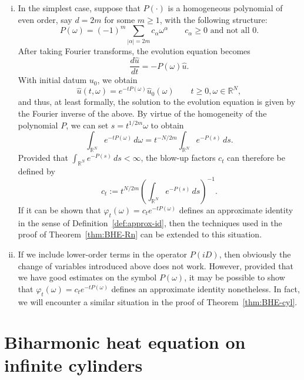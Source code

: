 \documentclass[a4paper, reqno,titlepage]{amsart}
\numberwithin{equation}{section}
\theoremstyle{plain}
\theoremstyle{definition}
\theoremstyle{remark}
\newcommand{\RR}{\mathbb{R}}
\begin{document}
\begin{enumerate}[(i)]
\item In the simplest case, suppose that $P(\cdot)$ is a homogeneous polynomial of even order, say $d = 2m$ for some $m \geq 1$, with the following structure:
  \begin{equation*}
    P(\omega) = (-1)^m \sum_{|\alpha| = 2m} c_\alpha \omega^\alpha \qquad c_\alpha \geq 0 \text{ and not all }0.
  \end{equation*}
  After taking Fourier transforms, the evolution equation becomes
  \begin{equation*}
    \frac{d \widehat{u}}{dt} = -P(\omega) \widehat{u}.
  \end{equation*}
  With initial datum $u_0$, we obtain
  \begin{equation*}
    \widehat{u}(t, \omega) = e^{-t P(\omega)} \widehat{u}_0(\omega) \qquad t \geq 0, \omega \in \RR^N,
  \end{equation*}
  and thus, at least formally, the solution to the evolution equation is given by the Fourier inverse of the above. By virtue of the homogeneity of the polynomial $P$, we can set $s = t^{1/2m} \omega$ to obtain
  \begin{equation*}
    \int_{\RR^N} e^{-tP(\omega)} \,d\omega = t^{-N/2m} \int_{\RR^N} e^{-P(s)} \,ds.
  \end{equation*}
  Provided that $\int_{\RR^N} e^{-P(s)} \,ds < \infty$, the blow-up factors $c_t$ can therefore be defined by
  \begin{equation*}
    c_t := t^{N/2m} \left(\int_{\RR^N} e^{-P(s)} \,ds \right)^{-1}.
  \end{equation*}
  If it can be shown that $\varphi_t(\omega) = c_t e^{-t P(\omega)}$ defines an approximate identity in the sense of Definition~\ref{def:approx-id}, then the techniques used in the proof of Theorem~\ref{thm:BHE-Rn} can be extended to this situation.

\item If we include lower-order terms in the operator $P(iD)$, then obviously the change of variables introduced above does not work. However, provided that we have good estimates on the symbol $P(\omega)$, it may be possible to show that $\varphi_t(\omega) = c_t e^{-tP(\omega)}$ defines an approximate identity nonetheless. In fact, we will encounter a similar situation in the proof of Theorem~\ref{thm:BHE-cyl}.
\end{enumerate}

\section{Biharmonic heat equation on infinite cylinders}
\label{sec:cyl}
\end{document}
